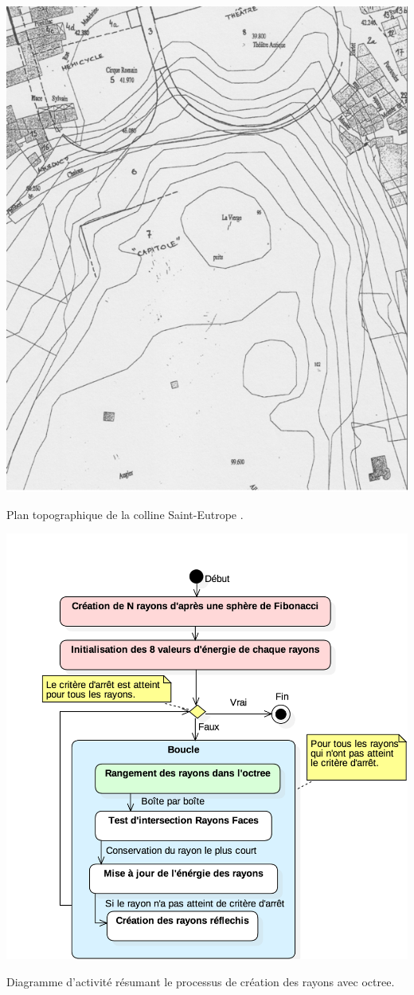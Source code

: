 \begin{figureth}
	\includegraphics[width=\linewidth]{images/colline}
	\caption[Plan topographique de la colline Saint-Eutrope.]{Plan topographique de la colline Saint-Eutrope \cite[p.11]{orangeTxt}.}
	\label{colline} 
\end{figureth}	

\begin{figureth}
	\includegraphics[width=0.9\linewidth]{images/DiagRay2}
	\caption{Diagramme d'activité résumant le processus de création des rayons avec \gls{octree}.}
	\label{DiagRay2}
\end{figureth}

